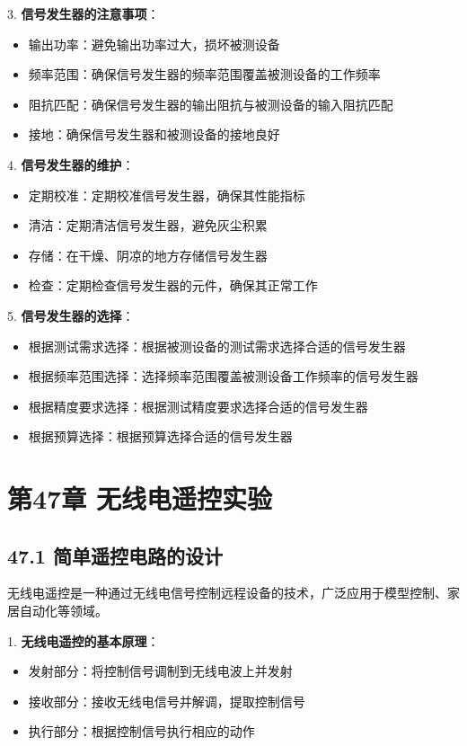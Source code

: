 \documentclass[12pt,UTF8]{ctexbook}
\begin{document}
3. \textbf{信号发生器的注意事项}：
   \begin{itemize}[leftmargin=3.5em]
   \item 输出功率：避免输出功率过大，损坏被测设备
   \item 频率范围：确保信号发生器的频率范围覆盖被测设备的工作频率
   \item 阻抗匹配：确保信号发生器的输出阻抗与被测设备的输入阻抗匹配
   \item 接地：确保信号发生器和被测设备的接地良好
   \end{itemize}

4. \textbf{信号发生器的维护}：
   \begin{itemize}[leftmargin=3.5em]
   \item 定期校准：定期校准信号发生器，确保其性能指标
   \item 清洁：定期清洁信号发生器，避免灰尘积累
   \item 存储：在干燥、阴凉的地方存储信号发生器
   \item 检查：定期检查信号发生器的元件，确保其正常工作
   \end{itemize}

5. \textbf{信号发生器的选择}：
   \begin{itemize}[leftmargin=3.5em]
   \item 根据测试需求选择：根据被测设备的测试需求选择合适的信号发生器
   \item 根据频率范围选择：选择频率范围覆盖被测设备工作频率的信号发生器
   \item 根据精度要求选择：根据测试精度要求选择合适的信号发生器
   \item 根据预算选择：根据预算选择合适的信号发生器
   \end{itemize}

\chapter*{第47章 无线电遥控实验}
\section*{47.1 简单遥控电路的设计}

无线电遥控是一种通过无线电信号控制远程设备的技术，广泛应用于模型控制、家居自动化等领域。

1. \textbf{无线电遥控的基本原理}：
   \begin{itemize}[leftmargin=3.5em]
   \item 发射部分：将控制信号调制到无线电波上并发射
   \item 接收部分：接收无线电信号并解调，提取控制信号
   \item 执行部分：根据控制信号执行相应的动作
   \end{itemize}
\end{document}
